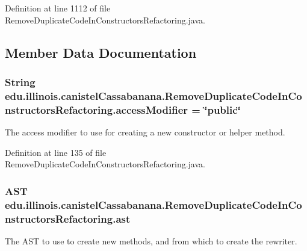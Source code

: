 Definition at line 1112 of file RemoveDuplicateCodeInConstructorsRefactoring.java.



\subsection{Member Data Documentation}
\hypertarget{classedu_1_1illinois_1_1canistelCassabanana_1_1RemoveDuplicateCodeInConstructorsRefactoring_ac98e605acbaebe4c90d19de7baae3798}{
\subsubsection[{accessModifier}]{\setlength{\rightskip}{0pt plus 5cm}String {\bf edu.illinois.canistelCassabanana.RemoveDuplicateCodeInConstructorsRefactoring.accessModifier} = \char`\"{}public\char`\"{}}}
\label{classedu_1_1illinois_1_1canistelCassabanana_1_1RemoveDuplicateCodeInConstructorsRefactoring_ac98e605acbaebe4c90d19de7baae3798}
The access modifier to use for creating a new constructor or helper method. 

Definition at line 135 of file RemoveDuplicateCodeInConstructorsRefactoring.java.

\hypertarget{classedu_1_1illinois_1_1canistelCassabanana_1_1RemoveDuplicateCodeInConstructorsRefactoring_ab3b3926a515821596ed383f908c322c1}{
\subsubsection[{ast}]{\setlength{\rightskip}{0pt plus 5cm}AST {\bf edu.illinois.canistelCassabanana.RemoveDuplicateCodeInConstructorsRefactoring.ast}}}
\label{classedu_1_1illinois_1_1canistelCassabanana_1_1RemoveDuplicateCodeInConstructorsRefactoring_ab3b3926a515821596ed383f908c322c1}
The AST to use to create new methods, and from which to create the rewriter. 

